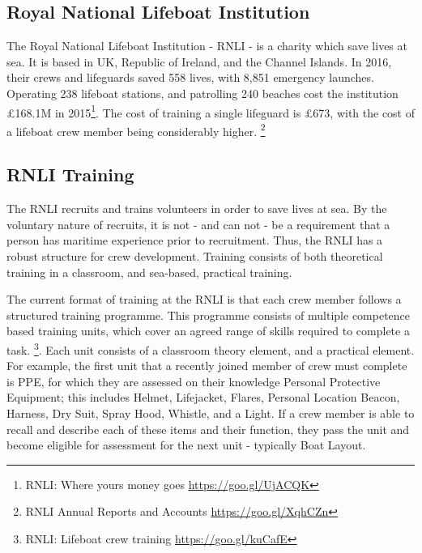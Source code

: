\documentclass[ %
                    author={Elis Jones},
                supervisor={Dr. Kirsten Cater},
                    degree={BSc},
                     title={The Effect of Presentation Medium on Spatial Cognition},
                  subtitle={in the Virtual Environment},
                      year={2018} ]{dissertation}
\begin{document}
\subsection{Royal National Lifeboat Institution}\label{rnli-money}
The Royal National Lifeboat Institution - RNLI - is a charity which save lives at sea. It is based in UK, Republic of Ireland, and the Channel Islands. In 2016, their crews and lifeguards saved 558 lives, with 8,851 emergency launches. Operating 238 lifeboat stations, and patrolling 240 beaches cost the institution £168.1M in 2015\footnote{RNLI: Where yours money goes \url{https://goo.gl/UjACQK}}. The cost of training a single lifeguard is £673, with the cost of a lifeboat crew member being considerably higher. \footnote{ RNLI Annual Reports and Accounts \url{https://goo.gl/XqhCZn}} 



\subsection{RNLI Training} \label{rnli_training}
The RNLI recruits and trains volunteers in order to save lives at sea. By the voluntary nature of recruits, it is not - and can not - be a requirement that a person has maritime experience prior to recruitment. Thus, the RNLI has a robust structure for crew development. Training consists of both theoretical training in a classroom, and sea-based, practical training.

The current format of training at the RNLI is that each crew member follows a structured training programme. This programme consists of multiple competence based training units, which cover an agreed range of skills required to complete a task. \footnote{RNLI: Lifeboat crew training \url{https://goo.gl/kuCafE}}. Each unit consists of a classroom theory element, and a practical element. For example, the first unit that a recently joined member of crew must complete is PPE, for which they are assessed on their knowledge Personal Protective Equipment; this includes Helmet, Lifejacket, Flares, Personal Location Beacon, Harness, Dry Suit, Spray Hood, Whistle, and a Light. If a crew member is able to recall and describe each of these items and their function, they pass the unit and become eligible for assessment for the next unit - typically Boat Layout. 
\end{document}
